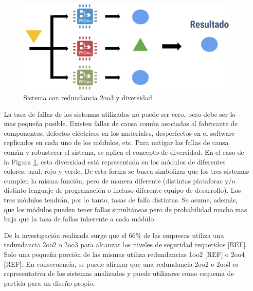     \begin{figure}[h]
        \centering
        \includegraphics[width=1\textwidth]{Figuras/redundancia.png}
        \centering\caption{Sistema con redundancia 2oo3 y diversidad.}
        \label{fig:redundancia}
    \end{figure}
    
    La tasa de fallas de los sistemas utilizados no puede ser cero, pero debe ser lo mas pequeña posible. Existen fallas de causa común asociadas al fabricante de componentes, defectos eléctricos en los materiales, desperfectos en el software replicados en cada uno de los módulos, etc. Para mitigar las fallas de causa común y robustecer el sistema, se aplica el concepto de diversidad. En el caso de la Figura \ref{fig:redundancia}, esta diversidad está representada en los módulos de diferentes colores: azul, rojo y verde. De esta forma se busca simbolizar que los tres sistemas cumplen la misma función, pero de manera diferente (distintas plataforas y/o distinto lenguaje de programación o incluso diferente equipo de desarrollo). Los tres módulos tendrán, por lo tanto, tasas de falla distintas. Se asume, además, que los módulos pueden tener fallas simultáneas pero de probabilidad mucho mas baja que la tasa de fallas inherente a cada módulo.
    
    De la investigación realizada surge que el 66\% de las empresas utiliza una redundancia 2oo2 o 2oo3 para alcanzar los niveles de seguridad requeridos [REF]. Solo una pequeña porción de las mismas utiliza redundancias 1oo2 [REF] o 2oo4 [REF]. En consecuencia, se puede afirmar que una redundancia 2oo2 o 2oo3 es representativa de los sistemas analizados y puede utilizarse como esquema de partida para un diseño propio.